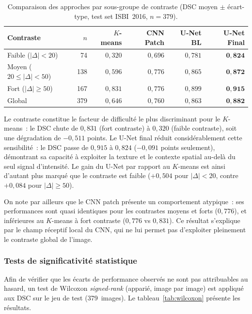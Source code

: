 \documentclass[12pt,a4paper]{article}
\begin{document}
\begin{table}[H]
\centering
\caption{Comparaison des approches par sous-groupe de contraste (DSC moyen $\pm$ écart-type, test set ISBI~2016, $n = 379$).}
\label{tab:comparatif_contrast}
\begin{tabular}{l r r r r r}
\toprule
\textbf{Contraste} & \textbf{$n$} & \textbf{$K$-means} & \textbf{CNN Patch} & \textbf{U-Net BL} & \textbf{U-Net Final} \\
\midrule
Faible ($|\Delta| < 20$)         & 74  & $0{,}320$ & $0{,}696$ & $0{,}781$ & $\mathbf{0{,}824}$ \\
Moyen ($20 \leq |\Delta| < 50$) & 138 & $0{,}596$ & $0{,}776$ & $0{,}865$ & $\mathbf{0{,}872}$ \\
Fort ($|\Delta| \geq 50$)       & 167 & $0{,}831$ & $0{,}776$ & $0{,}899$ & $\mathbf{0{,}915}$ \\
\midrule
Global                            & 379 & $0{,}646$ & $0{,}760$ & $0{,}863$ & $\mathbf{0{,}882}$ \\
\bottomrule
\end{tabular}
\end{table}

Le contraste constitue le facteur de difficulté le plus discriminant pour le $K$-means~: le DSC chute de $0{,}831$ (fort contraste) à $0{,}320$ (faible contraste), soit une dégradation de $-0{,}511$ points. Le U-Net final réduit considérablement cette sensibilité~: le DSC passe de $0{,}915$ à $0{,}824$ ($-0{,}091$ points seulement), démontrant sa capacité à exploiter la texture et le contexte spatial au-delà du seul signal d'intensité. Le gain du U-Net par rapport au $K$-means est ainsi d'autant plus marqué que le contraste est faible ($+0{,}504$ pour $|\Delta| < 20$, contre $+0{,}084$ pour $|\Delta| \geq 50$).

On note par ailleurs que le CNN patch présente un comportement atypique~: ses performances sont quasi identiques pour les contrastes moyens et forts ($0{,}776$), et inférieures au $K$-means à fort contraste ($0{,}776$ vs $0{,}831$). Ce résultat s'explique par le champ réceptif local du CNN, qui ne lui permet pas d'exploiter pleinement le contraste global de l'image.

\subsubsection{Tests de significativité statistique}

Afin de vérifier que les écarts de performance observés ne sont pas attribuables au hasard, un test de Wilcoxon \emph{signed-rank} (apparié, image par image) est appliqué aux DSC sur le jeu de test (379~images). Le tableau~\ref{tab:wilcoxon} présente les résultats.
\end{document}
